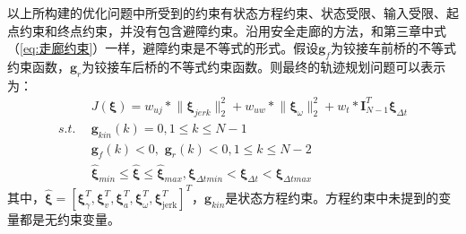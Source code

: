 \documentclass[master,academic]{ysuthesis} %
\begin{document}
		以上所构建的优化问题中所受到的约束有状态方程约束、状态受限、输入受限、起点约束和终点约束，并没有包含避障约束。沿用安全走廊的方法，和第三章中式（\ref{eq:走廊约束}）一样，避障约束是不等式的形式。假设$\bm{g}_{f}$为铰接车前桥的不等式约束函数，$\bm{g}_{r}$为铰接车后桥的不等式约束函数。则最终的轨迹规划问题可以表示为：
		\begin{equation}
			\begin{aligned}
			&J\left( \bm{\xi} \right) =w_{uj}*\lVert \bm{\xi} _{jerk} \rVert _{2}^{2}+w_{uw}*\lVert \bm{\xi} _{\omega} \rVert _{2}^{2}+w_t*\bm{I}_{N-1}^{T}\bm{\xi} _{\Delta t}\\
			s.t.\ \ &\bm{g}_{kin}\left( k \right) =0,1\leq k\leq N-1\\
			&\bm{g}_{f}\left( k \right) <0,\,\,\bm{g}_{r}\left( k \right) <0,1\leq k\leq N-2\\
			&\hat{\bm{\xi}}_{min}\le \hat{\bm{\xi}}\le \hat{\bm{\xi}}_{max},\bm{\xi} _{\Delta tmin}<\bm{\xi} _{\Delta t}<\bm{\xi} _{\Delta tmax}
			\end{aligned}   
		\end{equation}
		其中，$\hat{\bm{\xi}}=\left[ \bm{\xi} _{\gamma}^{T},\bm{\xi} _{v}^{T},\bm{\xi} _{a}^{T},\bm{\xi} _{\omega}^{T},\bm{\xi} _{\text{jerk}}^{T} \right] ^T$，$\bm{g}_{kin}$是状态方程约束。方程约束中未提到的变量都是无约束变量。
\end{document}
